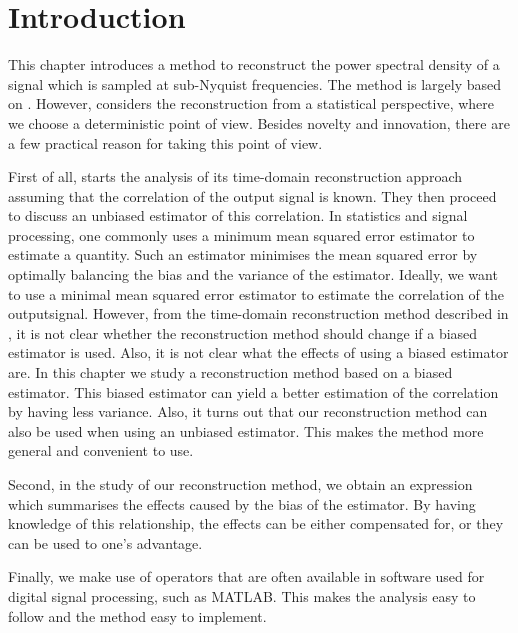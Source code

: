 \documentclass[a4paper, openany, oneside]{memoir}
\begin{document}
\section{Introduction}
This chapter introduces a method to reconstruct the power spectral density of a signal which is sampled at sub-Nyquist frequencies. The method is largely based on \cite{ariananda2012compressive}. However, \cite{ariananda2012compressive} considers the reconstruction from a statistical perspective, where we choose a deterministic point of view. Besides novelty and innovation, there are a few practical reason for taking this point of view.

First of all, \cite{ariananda2012compressive} starts the analysis of its time-domain reconstruction approach assuming that the correlation of the output signal is known. They then proceed to discuss an unbiased estimator of this correlation. In statistics and signal processing, one commonly uses a minimum mean squared error estimator to estimate a quantity. Such an estimator minimises the mean squared error by optimally balancing the bias and the variance of the estimator. Ideally, we want to use a minimal mean squared error estimator to estimate the correlation of the outputsignal. However, from the time-domain reconstruction method described in \cite{ariananda2012compressive}, it is not clear whether the reconstruction method should change if a biased estimator is used. Also, it is not clear what the effects of using a biased estimator are. In this chapter we study a reconstruction method based on a biased estimator. This biased estimator can yield a better estimation of the correlation by having less variance. Also, it turns out that our reconstruction method can also be used when using an unbiased estimator. This makes the method more general and convenient to use.

Second, in the study of our reconstruction method, we obtain an expression which summarises the effects caused by the bias of the estimator. By having knowledge of this relationship, the effects can be either compensated for, or they can be used to one's advantage.

Finally, we make use of operators that are often available in software used for digital signal processing, such as MATLAB. This makes the analysis easy to follow and the method easy to implement.
\end{document}
